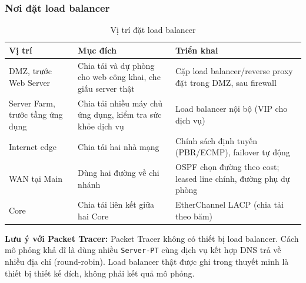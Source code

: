 \subsubsection{Nơi đặt load balancer}
\label{sec:lb}
\begin{small}
\setlength{\tabcolsep}{4pt}
\begin{longtable}{|p{3.6cm}|p{4.8cm}|p{5.4cm}|}
\caption{Vị trí đặt load balancer} \label{tab:lb_places} \\
\hline
\textbf{Vị trí} & \textbf{Mục đích} & \textbf{Triển khai} \\ \hline
\endhead
DMZ, trước Web Server & Chia tải và dự phòng cho web công khai, che giấu server thật & Cặp load balancer/reverse proxy đặt trong DMZ, sau firewall \\ \hline
Server Farm, trước tầng ứng dụng & Chia tải nhiều máy chủ ứng dụng, kiểm tra sức khỏe dịch vụ & Load balancer nội bộ (VIP cho dịch vụ) \\ \hline
Internet edge & Chia tải hai nhà mạng & Chính sách định tuyến (PBR/ECMP), failover tự động \\ \hline
WAN tại Main & Dùng hai đường về chi nhánh & OSPF chọn đường theo cost; leased line chính, đường phụ dự phòng \\ \hline
Core & Chia tải liên kết giữa hai Core & EtherChannel LACP (chia tải theo băm) \\ \hline
\end{longtable}
\end{small}
\noindent \textbf{Lưu ý với Packet Tracer:} Packet Tracer không có thiết bị load balancer. Cách mô phỏng khả dĩ là dùng nhiều \texttt{Server-PT} cùng dịch vụ kết hợp DNS trả về nhiều địa chỉ (round-robin). Load balancer thật được ghi trong thuyết minh là thiết bị thiết kế đích, không phải kết quả mô phỏng.

